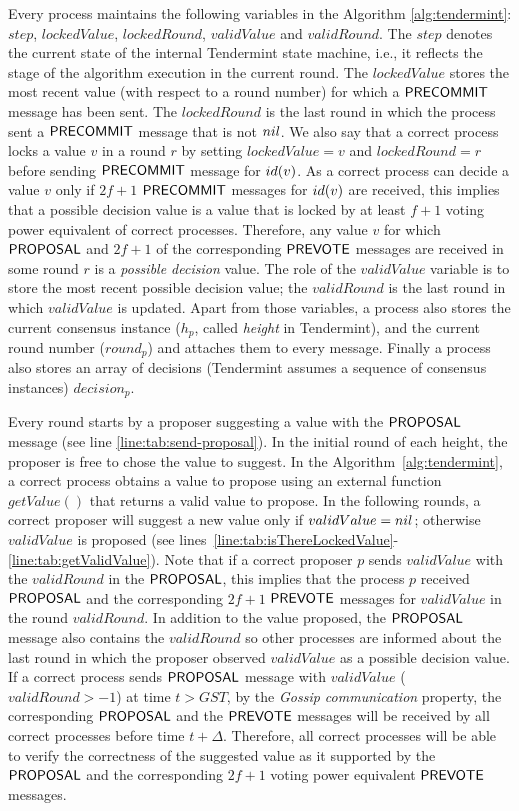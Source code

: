 Every process maintains the following variables in the Algorithm
\ref{alg:tendermint}: $step$, $lockedValue$, $lockedRound$, $validValue$ and
$validRound$. The $step$ denotes the current state of the internal Tendermint
state machine, i.e., it reflects the stage of the algorithm execution in the
current round. The $lockedValue$ stores the most recent value (with respect to
a round number) for which a $\mathsf{PRECOMMIT}$ message has been sent. The
$lockedRound$ is the last round in which the process sent a $\mathsf{PRECOMMIT}$
message that is not $nil$. We also say that a correct process locks a value
$v$ in a round $r$ by setting $lockedValue = v$ and $lockedRound = r$ before
sending $\mathsf{PRECOMMIT}$ message for $id(v)$. As a correct process can decide a
value $v$ only if $2f+1$ $\mathsf{PRECOMMIT}$ messages for $id(v)$ are received, this
implies that a possible decision value is a value that is locked by at least
$f+1$ voting power equivalent of correct processes. Therefore, any value $v$
for which $\mathsf{PROPOSAL}$ and $2f+1$ of the corresponding $\mathsf{PREVOTE}$ messages are
received in some round $r$ is a \emph{possible decision} value. The role of the
$validValue$ variable is to store the most recent possible decision value; the
$validRound$ is the last round in which $validValue$ is updated. Apart from
those variables, a process also stores the current consensus instance ($h_p$,
called \emph{height} in Tendermint), and the current round number ($round_p$)
and attaches them to every message. Finally a process also stores an array of
decisions (Tendermint assumes a sequence of consensus instances) $decision_p$. 

Every round starts by a proposer suggesting a value with the $\mathsf{PROPOSAL}$
message (see line \ref{line:tab:send-proposal}). In the initial round of each
height, the proposer is free to chose the value to suggest. In the
Algorithm~\ref{alg:tendermint}, a correct process obtains a value to propose
using an external function    $getValue()$ that returns a valid value to
propose. In the following rounds, a correct proposer will suggest a new value
only if $validValue = nil$; otherwise $validValue$ is proposed (see
lines~\ref{line:tab:isThereLockedValue}-\ref{line:tab:getValidValue}). Note
that if a correct proposer $p$ sends $validValue$ with the $validRound$ in the
$\mathsf{PROPOSAL}$, this implies that the process $p$ received $\mathsf{PROPOSAL}$ and the
corresponding $2f+1$ $\mathsf{PREVOTE}$ messages for $validValue$ in the round
$validRound$. In addition to the value proposed, the $\mathsf{PROPOSAL}$ message also
contains the $validRound$ so other processes are informed about the last round
in which the proposer observed $validValue$ as a possible decision value.  If a
correct process sends $\mathsf{PROPOSAL}$ message with $validValue$ ($validRound > -1$)
at time $t > GST$, by the \emph{Gossip communication} property, the
corresponding $\mathsf{PROPOSAL}$ and the $\mathsf{PREVOTE}$ messages will be received by all
correct processes before time $t+\Delta$. Therefore, all correct processes will
be able to verify the correctness of the suggested value as it supported by the
$\mathsf{PROPOSAL}$ and the corresponding $2f+1$ voting power equivalent $\mathsf{PREVOTE}$
messages.   

